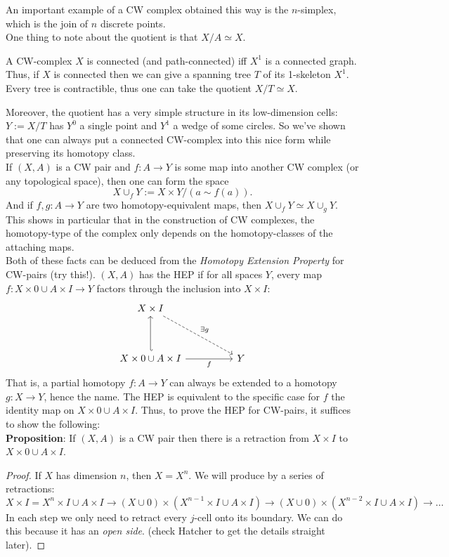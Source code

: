\documentclass{amsart}
\begin{document}
	An important example of a CW complex obtained this way is the $n$-simplex, which is the join of $n$ discrete points. \\
	
	One thing to note about the quotient is that $X/A \simeq X$.
	
	A CW-complex $X$ is connected (and path-connected) iff $X^1$ is a connected graph. Thus, if $X$ is connected then we can give a spanning tree $T$ of its 1-skeleton $X^1$. Every tree is contractible, thus one can take the quotient $X/T \simeq X$.
	
	 Moreover, the quotient has a very simple structure in its low-dimension cells: $Y:= X/T$ has $Y^0$ a single point and $Y^1$ a wedge of some circles. So we've shown that one can always put a connected CW-complex into this nice form while preserving its homotopy class.\\
	 
	 If $(X,A)$ is a CW pair and $f:A\to Y$ is some map into another CW complex (or any topological space), then one can form the space
	 $$
	 X\cup_f Y := X\times Y / (a \sim f(a)).
	 $$
	 And if $f,g:A\to Y$ are two homotopy-equivalent maps, then $X\cup_fY \simeq X\cup_g Y$. This shows in particular that in the construction of CW complexes, the homotopy-type of the complex only depends on the homotopy-classes of the attaching maps.\\
	 
	 Both of these facts can be deduced from the \textit{Homotopy Extension Property} for CW-pairs (try this!). $(X,A)$ has the HEP if for all spaces $Y$, every map $f:X\times 0 \cup A\times I\to Y$ factors through the inclusion into $X\times I$:
	 $$
	 \begin{tikzcd}
	 	{X\times I} \\
	 	\\
	 	{X\times 0 \cup A\times I} && Y
	 	\arrow["{\exists g}", dashed, from=1-1, to=3-3]
	 	\arrow[hook', from=3-1, to=1-1]
	 	\arrow["f"', from=3-1, to=3-3]
	 \end{tikzcd}
	 $$
	 That is, a partial homotopy $f:A\to Y$ can always be extended to a homotopy $g:X\to Y$, hence the name. The HEP is equivalent to the specific case for $f$ the identity map on $X\times 0 \cup A\times I$. Thus, to prove the HEP for CW-pairs, it suffices to show the following: \\
	 
	 \textbf{Proposition}: If $(X,A)$ is a CW pair then there is a retraction from $X\times I$ to $X\times 0 \cup A\times I$.
	 \begin{proof}
	 	If $X$ has dimension $n$, then $X=X^n$. We will produce by a series of retractions:
	 	$$
	 	X\times I  = X^n\times I \cup A \times I \to (X\cup 0)\times (X^{n-1}\times I \cup A \times I) \to (X\cup 0)\times (X^{n-2}\times I \cup A \times I) \to \dots
	 	$$
	 	In each step we only need to retract every $j$-cell onto its boundary. We can do this because it has an \textit{open side}. (check Hatcher to get the details straight later).
	 \end{proof}\\
	 
\end{document}
